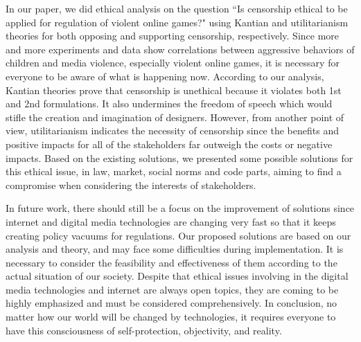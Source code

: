 
In our paper, we did ethical analysis on the question ``Is censorship ethical to be applied for regulation of violent online games?" using Kantian and utilitarianism theories for both opposing and supporting censorship, respectively. Since more and more experiments and data show correlations between aggressive behaviors of children and media violence, especially violent online games, it is necessary for everyone to be aware of what is happening now. According to our analysis, Kantian theories prove that censorship is unethical because it violates both 1st and 2nd formulations. It also undermines the freedom of speech which would stifle the creation and imagination of designers. However, from another point of view, utilitarianism indicates the necessity of censorship since the benefits and positive impacts for all of the stakeholders far outweigh the costs or negative impacts. Based on the existing solutions, we presented some possible solutions for this ethical issue, in law, market, social norms and code parts, aiming to find a compromise when considering the interests of stakeholders.

In future work, there should still be a focus on the improvement of solutions since internet and digital media technologies are changing very fast so that it keeps creating policy vacuums for regulations. Our proposed solutions are based on our analysis and theory, and may face some difficulties during implementation. It is necessary to consider the feasibility and effectiveness of them according to the actual situation of our society. Despite that ethical issues involving in the digital media technologies and internet are always open topics, they are coming to be highly emphasized and must be considered comprehensively. In conclusion, no matter how our world will be changed by technologies, it requires everyone to have this consciousness of self-protection, objectivity, and reality.